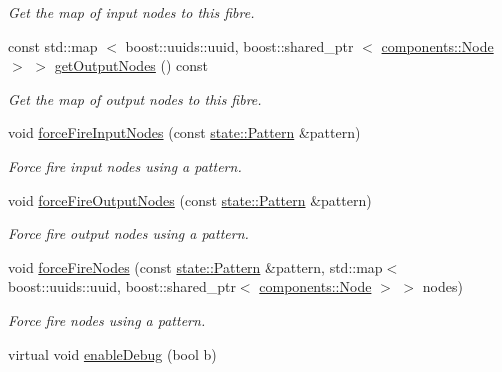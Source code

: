 \begin{DoxyCompactItemize}
\begin{DoxyCompactList}\small\item\em \-Get the map of input nodes to this fibre. \end{DoxyCompactList}\item 
const std\-::map\*
$<$ boost\-::uuids\-::uuid, \*
boost\-::shared\-\_\-ptr\*
$<$ \hyperlink{classcryomesh_1_1components_1_1Node}{components\-::\-Node} $>$ $>$ \hyperlink{classcryomesh_1_1structures_1_1Fibre_abd4b9cfb1609c78328c68f0328305da6}{get\-Output\-Nodes} () const 
\begin{DoxyCompactList}\small\item\em \-Get the map of output nodes to this fibre. \end{DoxyCompactList}\item 
void \hyperlink{classcryomesh_1_1structures_1_1Fibre_aaaa3f6a37c969442df3934aa1b3a329d}{force\-Fire\-Input\-Nodes} (const \hyperlink{classcryomesh_1_1state_1_1Pattern}{state\-::\-Pattern} \&pattern)
\begin{DoxyCompactList}\small\item\em \-Force fire input nodes using a pattern. \end{DoxyCompactList}\item 
void \hyperlink{classcryomesh_1_1structures_1_1Fibre_a74a3909fe54fb569f60e1236c43c2eec}{force\-Fire\-Output\-Nodes} (const \hyperlink{classcryomesh_1_1state_1_1Pattern}{state\-::\-Pattern} \&pattern)
\begin{DoxyCompactList}\small\item\em \-Force fire output nodes using a pattern. \end{DoxyCompactList}\item 
void \hyperlink{classcryomesh_1_1structures_1_1Fibre_a5e2e81cc368683f575a573416d4a4a09}{force\-Fire\-Nodes} (const \hyperlink{classcryomesh_1_1state_1_1Pattern}{state\-::\-Pattern} \&pattern, std\-::map$<$ boost\-::uuids\-::uuid, boost\-::shared\-\_\-ptr$<$ \hyperlink{classcryomesh_1_1components_1_1Node}{components\-::\-Node} $>$ $>$ nodes)
\begin{DoxyCompactList}\small\item\em \-Force fire nodes using a pattern. \end{DoxyCompactList}\item 
virtual void \hyperlink{classcryomesh_1_1structures_1_1Fibre_a2ee7eb11f1777688fd2b3c5fcb5349f3}{enable\-Debug} (bool b)
\end{DoxyCompactItemize}

